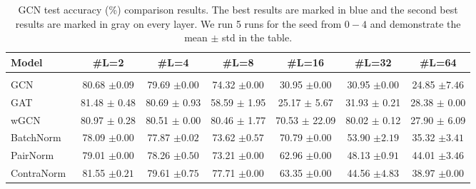 \begin{table}[h]
\centering
\small
\caption{GCN test accuracy (\%) comparison results. The best results are marked in blue and the second best results are marked in gray on every layer. We run 5 runs for the seed from $0-4$ and demonstrate the mean $\pm$ std in the table.}
\begin{adjustbox}{width=0.99\textwidth}
\begin{tabular}{lcccccc}
\toprule
 Model             & \#L=2              & \#L=4              & \#L=8              & \#L=16             & \#L=32             & \#L=64\\

\midrule
\rowcolor{gray!8}\multicolumn{7}{c}{\textit{Cora}~\citep{cora}}\\
\midrule
  GCN~\citep{gcn} & \cellcolor{secondbest}80.68 {\footnotesize$\pm 0.09$} & \cellcolor{secondbest}79.69 {\footnotesize$\pm 0.00$} & 74.32 {\footnotesize$\pm 0.00$} & 30.95 {\footnotesize$\pm 0.00$} & 30.95 {\footnotesize$\pm 0.00$} & 24.85 {\footnotesize$\pm 7.46$} \\
GAT~\citep{gat} & 81.48 {\footnotesize$\pm$ 0.48} & 80.69 {\footnotesize$\pm$ 0.93} & 58.59 {\footnotesize$\pm$ 1.95} & 25.17 {\footnotesize$\pm$ 5.67} & 31.93 {\footnotesize$\pm$ 0.21} & 28.38 {\footnotesize$\pm$ 0.00} \\
wGCN~\citep{wGCN} & 80.97 {\footnotesize$\pm$ 0.28} & 80.51 {\footnotesize$\pm$ 0.00} & 80.46 {\footnotesize$\pm$ 1.77} & 70.53 {\footnotesize$\pm$ 22.09} & 80.02 {\footnotesize$\pm$ 0.12} & 27.90 {\footnotesize$\pm$ 6.09} \\
    BatchNorm~\citep{batchnorm} & 78.09 {\footnotesize$\pm 0.00$} & 77.87 {\footnotesize$\pm 0.02$} & 73.62 {\footnotesize$\pm 0.57$} & 70.79 {\footnotesize$\pm 0.00$} & 53.90 {\footnotesize$\pm 2.19$} & 35.32 {\footnotesize$\pm 3.41$}\\
    PairNorm~\citep{pairnorm} & 79.01 {\footnotesize$\pm 0.00$} & 78.26 {\footnotesize$\pm 0.50$} & 73.21 {\footnotesize$\pm 0.00$} & 62.96 {\footnotesize$\pm 0.00$} & 48.13 {\footnotesize$\pm 0.91$} & 44.01 {\footnotesize$\pm 3.46$} \\
    ContraNorm~\citep{contranorm} & \cellcolor{best}81.55 {\footnotesize$\pm 0.21$} & 79.61 {\footnotesize$\pm 0.75$} & 77.71 {\footnotesize$\pm 0.00$} & 63.35 {\footnotesize$\pm 0.00$} & 44.56 {\footnotesize$\pm 4.83$} & 38.97 {\footnotesize$\pm 0.00$} \\

\end{tabular}
\end{adjustbox}
\end{table}
